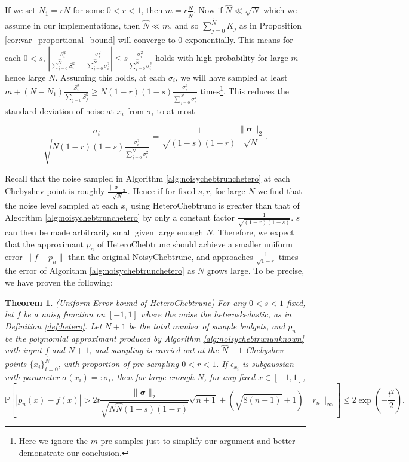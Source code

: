 \documentclass[pdflatex,sn-mathphys-num]{sn-jnl}%
\theoremstyle{thmstyleone}%
\newtheorem{theorem}{Theorem}%
\theoremstyle{thmstyletwo}%
\theoremstyle{thmstylethree}%
\begin{document}
If we set $N_1 = rN$ for some $0<r<1$, then $m = r\frac{N}{\hat{N}}$. Now if $\hat{N} \ll \sqrt{N}$ which we assume in our implementations, then $ \hat{N} \ll m$, and so $\sum_{j=0}^{\hat{N}} K_j$ as in Proposition \ref{cor:var_proportional_bound} will converge to 0 exponentially. This means for each $0<s$, $ \left|\frac{S_i^2}{\sum_{j=0}^{\hat{N}}S_i^2} - \frac{\sigma_i^2}{\sum_{j=0}^{\hat{N}}\sigma_i^2}\right| \leq s\frac{\sigma_i^2}{\sum_{j=0}^{\hat{N}}\sigma_i^2}$ holds with high probability for large $m$ hence large $N$. Assuming this holds, at each $\sigma_i$, we will have sampled at least $ m+(N-N_1)\frac{S^2_i}{\sum_{j=0} S^2_j} \geq N(1-r)(1-s)\frac{\sigma_i^2}{\sum_{j=0}^{\hat{N}}\sigma_i^2}$ times\footnote{Here we ignore the $m$ pre-samples just to simplify our argument and better demonstrate our conclusion.}. This reduces the standard deviation of noise at $x_i$ from $\sigma_i$ to at most

\[\frac{\sigma_i}{\sqrt{N(1-r)(1-s)\frac{\sigma_i^2}{\sum_{j=0}^{\hat{N}}\sigma_i^2}}} = \frac{1}{\sqrt{(1-s)(1-r)}}\frac{\|\bm{\sigma}\|_2}{\sqrt{N}}. \]


Recall that the noise sampled in Algorithm \ref{alg:noisychebtrunchetero} at each Chebyshev point is roughly $\frac{\|\bm{\sigma}\|_2}{\sqrt{N}}$. Hence if for fixed $s, r$, for large $N$ we find that the noise level sampled at each $x_i$ using HeteroChebtrunc is greater than that of Algorithm \ref{alg:noisychebtrunchetero} by only a constant factor $\frac{1}{\sqrt{(1-r)(1-s)}}$. $ s $ can then be made arbitrarily small given large enough $N$. Therefore, we expect that the approximant $p_n$ of HeteroChebtrunc should achieve a smaller uniform error $\|f-p_n\|$ than the original NoisyChebtrunc, and approaches $\frac{1}{\sqrt{1-r}}$ times the error of Algorithm \ref{alg:noisychebtrunchetero} as $N$ grows large. To be precise, we have proven the following:

\begin{theorem}
    (Uniform Error bound of HeteroChebtrunc) For any $ 0 < s < 1$ fixed, let $f$ be a noisy function on $[-1,1]$ where the noise the heteroskedastic, as in Definition \ref{def:hetero}. Let $N+1$ be the total number of sample budgets, and $p_n$ be the polynomial approximant produced by Algorithm \ref{alg:noisychebtrununknown} with input $f$ and $N+1$, and sampling is carried out at the $\hat{N}+1$ Chebyshev points $\{x_i\}_{i=0}^{\hat{N}}$, with proportion of pre-sampling $0<r<1$. If $\epsilon_{x_i}$ is subgaussian with parameter $ \sigma(x_i)=: \sigma_i $, then for large enough $N$, for any fixed $x\in [-1,1]$,
	\[\mathbb{P} \left[|p_n(x)-f(x)| > 2t\frac{\|\bm{\sigma}\|_2}{\sqrt{N\hat{N}(1-s)(1-r)}} \sqrt{n+1} + (\sqrt{8(n+1)}+1)\|r_n \|_\infty\right] \leq 2\exp(-\frac{t^2}{2}).\] 
\end{theorem}
\end{document}
